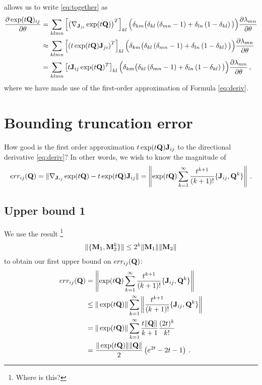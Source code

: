 \documentclass[12pt]{article} %
\begin{document}
allows us to write \eqref{eq:together} as
\begin{align*}
		\frac{\partial \exp(t\mathbf{Q})_{ij}}{\partial \theta} &=  \sum_{klmn}  \left[ \left( \nabla_{\mathbf{J}_{ji}} \exp(t\mathbf{Q}) \right)^T  \right]_{kl} \Big(\delta_{km} \big( \delta_{kl} \left(\delta_{mn}-1\right) + \delta_{ln}\left(1-\delta_{kl}\right) \big) \Big) \frac{\partial \lambda_{mn}}{\partial \theta} \\
		&\approx  \sum_{klmn}  \left[ \left( t \exp(t\mathbf{Q}) \mathbf{J}_{ji} \right)^T  \right]_{kl} \Big(\delta_{km} \big( \delta_{kl} \left(\delta_{mn}-1\right) + \delta_{ln}\left(1-\delta_{kl}\right) \big) \Big) \frac{\partial \lambda_{mn}}{\partial \theta} \\
		&= \sum_{klmn}  \left[  t \mathbf{J}_{ij} \exp(t\mathbf{Q})^T \right]_{kl} \Big(\delta_{km} \big( \delta_{kl} \left(\delta_{mn}-1\right) + \delta_{ln}\left(1-\delta_{kl}\right) \big) \Big) \frac{\partial \lambda_{mn}}{\partial \theta} \, ,
\end{align*}
where we have made use of the first-order approximation of Formula \eqref{eq:deriv}.




\section{Bounding truncation error}

How good is the first order approximation $t \exp(t\mathbf{Q})\mathbf{J}_{ij}$ to the directional derivative \eqref{eq:deriv}?  In other words, we wish to know the magnitude of
\begin{align*}
err_{ij}(\mathbf{Q}) =	\Vert\nabla_{\mathbf{J}_{ij}} \exp(t\mathbf{Q}) - t \exp(t\mathbf{Q})\mathbf{J}_{ij} \Vert = \left\Vert \exp(t\mathbf{Q})  \sum_{k=1}^\infty \frac{t^{k+1}}{(k+1)!} \{\mathbf{J}_{ij},\mathbf{Q}^k\} \right\Vert \, .
\end{align*}

\subsection{Upper bound 1}



We use the result \citep{najfeld1995derivatives}\footnote{Where is this?}
\begin{align*}
	\Vert \{\mathbf{M}_1, \mathbf{M}_2^k \}  \Vert \leq 2^k \Vert \mathbf{M}_1\Vert \Vert\mathbf{M}_2 \Vert 
\end{align*}
to obtain our first upper bound on $err_{ij}(\mathbf{Q})$:
\begin{align*}
	err_{ij}(\mathbf{Q}) &= \left\Vert \exp(t\mathbf{Q})  \sum_{k=1}^\infty \frac{t^{k+1}}{(k+1)!} \{\mathbf{J}_{ij},\mathbf{Q}^k\} \right\Vert  \\
	&\leq \Vert \exp(t\mathbf{Q}) \Vert \sum_{k=1}^\infty \left\Vert \frac{t^{k+1}}{(k+1)!} \{\mathbf{J}_{ij},\mathbf{Q}^k\} \right\Vert  \\
	&=  \Vert \exp(t\mathbf{Q}) \Vert \sum_{k=1}^\infty \frac{t \Vert \mathbf{Q} \Vert}{k+1} \frac{(2t)^k}{k!}\\
	&= \frac{\Vert \exp(t\mathbf{Q}) \Vert \Vert\mathbf{Q}\Vert}{2}   \left(e^{2t} - 2t-1 \right) \, .
\end{align*}
\end{document}

